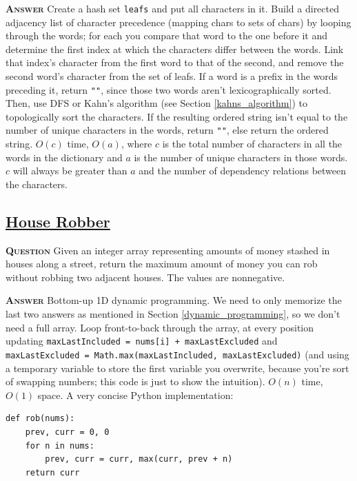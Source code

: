\documentclass[table, xcdraw]{article}%
\begin{document}
\textsc{\textbf{Answer}} Create a hash set \texttt{leafs} and put all characters in it. Build a directed adjacency list of character precedence (mapping chars to sets of chars) by looping through the words; for each you compare that word to the one before it and determine the first index at which the characters differ between the words. Link that index's character from the first word to that of the second, and remove the second word's character from the set of leafs. If a word is a prefix in the words preceding it, return \texttt{""}, since those two words aren't lexicographically sorted. Then, use DFS or Kahn's algorithm (see Section \ref{kahns_algorithm}) to topologically sort the characters. If the resulting ordered string isn't equal to the number of unique characters in the words, return \texttt{""}, else return the ordered string. $O(c)$ time, $O(a)$, where $c$ is the total number of characters in all the words in the dictionary and $a$ is the number of unique characters in those words. $c$ will always be greater than $a$ and the number of dependency relations between the characters.

\subsection{\href{https://leetcode.com/problems/house-robber}{House Robber}}

\textsc{\textbf{Question}} Given an integer array representing amounts of money stashed in houses along a street, return the maximum amount of money you can rob without robbing two adjacent houses. The values are nonnegative.

\textsc{\textbf{Answer}} Bottom-up 1D dynamic programming. We need to only memorize the last two answers as mentioned in Section \ref{dynamic_programming}, so we don't need a full array. Loop front-to-back through the array, at every position updating \texttt{maxLastIncluded = nums[i] + maxLastExcluded} and \texttt{maxLastExcluded = Math.max(maxLastIncluded, maxLastExcluded)} (and using a temporary variable to store the first variable you overwrite, because you're sort of swapping numbers; this code is just to show the intuition). $O(n)$ time, $O(1)$ space. A very concise Python implementation:

\begin{verbatim}
def rob(nums):
    prev, curr = 0, 0
    for n in nums:
        prev, curr = curr, max(curr, prev + n)
    return curr
\end{verbatim}
\end{document}
